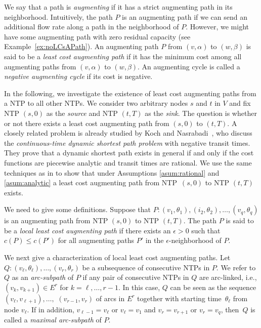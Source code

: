 \documentclass{svjour3}                     \smartqed
\begin{document}
We say that a path is \emph{augmenting} if it has a strict augmenting path in its neighborhood. Intuitively, the path $P$ is an augmenting path if we can send an additional flow rate along a path in the neighborhood of $P$. However, we might have some augmenting path with zero residual capacity (see Example~\ref{ex:noLCsAPath}). An augmenting path $P$ from $(v,\alpha)$ to $(w,\beta)$ is said to be a \emph{least cost augmenting path} if it has the minimum cost among all augmenting paths from $(v,\alpha)$ to $(w,\beta)$. An augmenting cycle is called a \emph{negative augmenting cycle} if its cost is negative.

In the following, we investigate the existence of least cost augmenting paths from a NTP to all other NTPs. 
We consider two arbitrary nodes $s$ and $t$ in $V$ and fix NTP $(s,0)$ as the \emph{source} and NTP $(t,T)$ as the \emph{sink}. The question is whether or not there exists a least cost augmenting path from $(s,0)$ to $(t,T)$. A closely related problem is already studied by Koch and Nasrabadi~\cite{KochNasr10}, who discuss the \emph{continuous-time dynamic shortest path problem} with negative transit times. They prove that a dynamic shortest path exists in general if and only if the cost functions are piecewise analytic and transit times are rational. We use the same techniques as in \cite{KochNasr10} to show that under Assumptions \ref{asum:rational} and \ref{asum:analytic} a least cost augmenting path from NTP~$(s,0)$ to NTP $(t,T)$ exists.

We need to give some definitions. Suppose that $P:(v_1,\theta_{1}),(i_2,\theta_{2}),\ldots,(v_q,\theta_{q})$ is an augmenting path from NTP $(s,0)$ to NTP $(t,T)$. The path $P$ is said to be a \emph{local least cost augmenting path} if there exists an
$\epsilon>0$ such that $c(P)\leq c({P'})$ for all augmenting paths $P'$ in the $\epsilon$-neighborhood of $P$.

We next give a characterization of local least cost augmenting paths. Let $Q:(v_\ell,\theta_\ell),\ldots,(v_r,\theta_r)$ be a subsequence of consecutive NTPs in $P$. We refer to $Q$ as an \emph{arc-subpath} of $P$ if any pair of consecutive NTPs in $Q$ are arc-linked, i.e., $(v_{k},v_{k+1})\in E^r$ for $k=\ell,\ldots,r-1$. In this case, $Q$ can be seen as the sequence  $(v_{\ell},v_{\ell+1}),\ldots,$ $(v_{r-1},v_r)$ of arcs in $E^r$ together with starting time~$\theta_\ell$ from node $v_\ell$. If in addition, $v_{\ell-1}= v_{\ell}$ or $v_{\ell}=v_1$ and $v_{r}= v_{r+1}$ or $v_{r}=v_q$, then~$Q$ is called a \emph{maximal arc-subpath} of $P$. 
\end{document}
